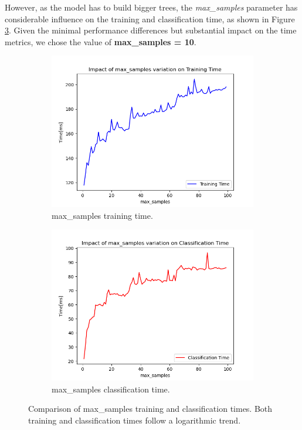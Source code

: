 \documentclass[futureinternet,article,submit,pdftex,moreauthors]{Definitions/mdpi}
\begin{document}
However, as the model has to build bigger trees, the \textit{max\_samples} parameter has considerable influence on the training and classification time, as shown in Figure \ref{fig:max_samples_time_comparison}.
Given the minimal performance differences but substantial impact on the time metrics, we chose the value of \textbf{max\_samples = 10}. 

\begin{figure}[H]
	\centering
	\begin{subfigure}{0.49\textwidth}
		\centering
		\includegraphics[width=\textwidth]{img/maxSamplesTrainingTime.png}
		\caption{max\_samples training time.}
		\label{fig:max_samples_training_time}
	\end{subfigure}
	\hfill
	\begin{subfigure}{0.49\textwidth}
		\centering
		\includegraphics[width=\textwidth]{img/maxSamplesClassificationTime.png}
		\caption{max\_samples classification time.}
		\label{fig:max_samples_classification_time}
	\end{subfigure}
	\caption{Comparison of max\_samples training and classification times. Both training and classification times follow a logarithmic trend.}
	\label{fig:max_samples_time_comparison}
\end{figure}
\end{document}
